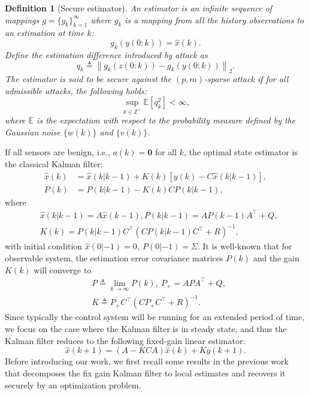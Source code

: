 \documentclass{ieeetrans}   %
\newcommand{\Eb}{{\mathbb{E}}}
\newcommand{\Zb}{{\mathbb{Z}}}
\newcommand{\ift}{{\infty}}
\newtheorem{definition}{\textbf{Definition}}
\begin{document}
\begin{definition}[Secure estimator]\label{def:resi}
	An estimator is an infinite sequence of mappings $g=\{g_k\}_{k=1}^{\ift}$ where $g_k$ is a mapping from all the history observations to an estimation at time $k$:
	$$g_k\left(y(0:k)\right)=\hat{x}(k).$$
	Define the estimation difference introduced by attack as
	$$q_k\triangleq \left\|g_k\left(z(0:k)\right)-g_k\left(y(0:k)\right) \right\|_2 .
	$$
	The estimator is said to be secure against the $(p, m)$-sparse attack if for all admissible attacks, the following holds:
	$$\sup_{k\in\Zb^+} \Eb \left[q_k^2\right] < \ift ,$$
	where $\Eb$ is the expectation with respect to the probability measure defined by the Gaussian noise $\{w(k)\}$ and $\{v(k)\}$.
\end{definition}
If all sensors are benign, i.e., $a(k)=\mathbf{0}$ for all $k$, the optimal state estimator is the classical Kalman filter:
\begin{align*}
	\hat{x}(k)&=\hat{x}(k | k-1)+K(k)\left[y(k)-C \hat{x}(k  | k-1)\right] ,\\
	P(k)&=P(k  | k-1)-K(k) C P(k  | k-1),
\end{align*}
where
\begin{align*}
	&\hat{x}(k  | k-1)=A \hat{x}(k-1), P(k  | k-1)=A P(k-1) A^{\top}+Q ,\\	
	&K(k)=P(k  | k-1) C^{\top}\left(C P(k  | k-1) C^{\top}+R\right)^{-1},
\end{align*}
with initial condition $\hat{x}(0  |-1)=0,\ P(0  |-1)=\Sigma $.
It is well-known that for observable system, the estimation error covariance matrices $P(k)$ and the gain $K(k)$ will converge to
\begin{align*}
	&P \triangleq \lim _{k \rightarrow \infty} P(k),\ P_{+}=A P A^{\top}+Q ,\\
	&K \triangleq P_{+} C^{\top}\left(C P_{+} C^{\top}+R\right)^{-1}.
\end{align*}
Since typically the control system will be running for an extended period of time, we focus on the case where the Kalman filter is in steady state, and thus the Kalman filter reduces to the following fixed-gain linear estimator:
\begin{equation}\label{eq:fix_gain_kalman}
	\hat{x}(k+1)=(A-K C A) \hat{x}(k)+K y(k+1) .
\end{equation}
Before introducing our work, we first recall some results in the previous work that decomposes the fix gain Kalman filter to local estimates and recovers it securely by an optimization problem. %
\end{document}
